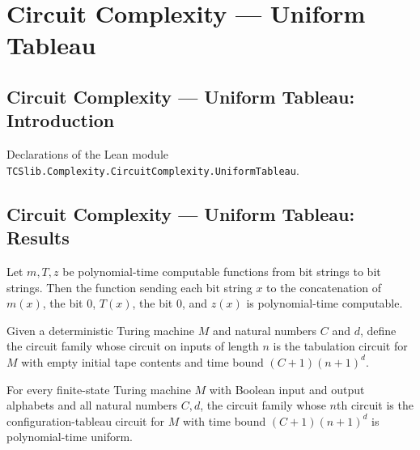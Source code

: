 \section{Circuit Complexity --- Uniform Tableau}
\subsection*{Circuit Complexity --- Uniform Tableau: Introduction}

Declarations of the Lean module \texttt{TCSlib.Complexity.CircuitComplexity.UniformTableau}.

\subsection*{Circuit Complexity --- Uniform Tableau: Results}

\begin{theorem}
\label{Complexity.polyTimeComputable_tabInput}
\leanok
{}
Let $m,T,z$ be polynomial-time computable functions from bit strings to bit strings.
Then the function sending each bit string $x$ to the concatenation of $m(x)$, the bit
$0$, $T(x)$, the bit $0$, and $z(x)$ is polynomial-time computable.
\end{theorem}

\begin{definition}
\label{Complexity.tabFamily}
\leanok
{}
Given a deterministic Turing machine $M$ and natural numbers $C$ and $d$, define the
circuit family whose circuit on inputs of length $n$ is the tabulation circuit for $M$
with empty initial tape contents and time bound $(C+1)(n+1)^d$.
\end{definition}

\begin{theorem}
\label{Complexity.tabFamily_isPUniform}
\leanok
{}
For every finite-state Turing machine $M$ with Boolean input and output alphabets and
all natural numbers $C,d$, the circuit family whose $n$th circuit is the
configuration-tableau circuit for $M$ with time bound $(C+1)(n+1)^d$ is polynomial-time
uniform.
\end{theorem}

